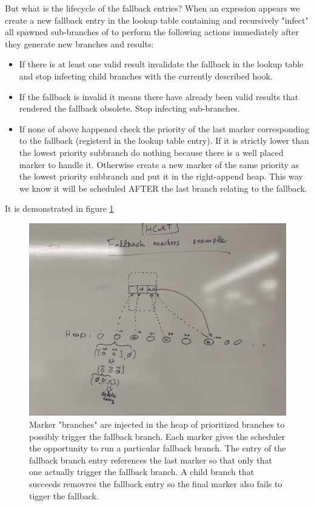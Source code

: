 But what is the lifecycle of the fallback entries? When an exprssion
 appears we create a new fallback entry in the lookup table
containing  and recursively "infect" all spawned sub-branches of
 to perform the following actions immediately after they generate
new branches and results:

\begin{itemize}
\item If there is at least one valid result invalidate the fallback in the
lookup table and stop infecting child branches with the currently
described hook.
\item If the fallback is invalid it means there have already been valid
results that rendered the fallback obsolete. Stop infecting
sub-branches.
\item If none of above happened check the priority of the last marker
corresponding to the fallback (registerd in the lookup table
entry). If it is strictly lower than the lowest priority
subbranch do nothing because there is a well placed marker to
handle it. Otherwise create a new marker of the same priority as
the lowest priority subbranch and put it in the right-append
heap. This way we know it will be scheduled AFTER the last branch
relating to the fallback.
\end{itemize}


It is demonstrated in figure \ref{fig:org90c1788}


\begin{figure}[p]
\centering
\includegraphics[width=.9\linewidth]{./imgs/2021-10-28_13-20-45_screenshot.png}
\caption{\label{fig:org90c1788}Marker "branches" are injected in the
  heap of prioritized branches to possibly trigger the fallback
  branch. Each marker gives the scheduler the opportunity to run a
  particular fallback branch. The entry of the fallback branch entry
  references the last marker so that only that one actually trigger
  the fallback branch. A child branch that succeeds removres the
  fallback entry so the final marker also fails to tigger the
  fallback.}
\end{figure}



